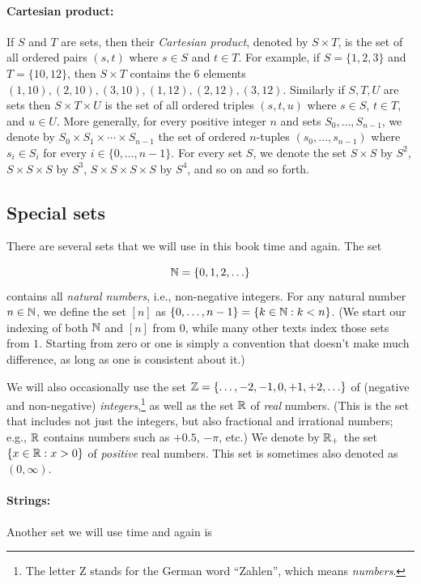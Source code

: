 \paragraph{Cartesian product:} If \(S\) and \(T\) are sets, then their
\emph{Cartesian product}, denoted by \(S \times T\), is the set of all
ordered pairs \((s,t)\) where \(s\in S\) and \(t\in T\). For example, if
\(S = \{1,2,3 \}\) and \(T = \{10,12 \}\), then \(S\times T\) contains
the \(6\) elements \((1,10),(2,10),(3,10),(1,12),(2,12),(3,12)\).
Similarly if \(S,T,U\) are sets then \(S\times T \times U\) is the set
of all ordered triples \((s,t,u)\) where \(s\in S\), \(t\in T\), and
\(u\in U\). More generally, for every positive integer \(n\) and sets
\(S_0,\ldots,S_{n-1}\), we denote by
\(S_0 \times S_1 \times \cdots \times S_{n-1}\) the set of ordered
\(n\)-tuples \((s_0,\ldots,s_{n-1})\) where \(s_i\in S_i\) for every
\(i \in \{0,\ldots, n-1\}\). For every set \(S\), we denote the set
\(S\times S\) by \(S^2\), \(S\times S\times S\) by \(S^3\),
\(S\times S\times S \times S\) by \(S^4\), and so on and so forth.

\subsection{Special sets}\label{specialsets}

There are several sets that we will use in this book time and again. The
set

\[
{\mathbb{N}} = \{ 0, 1,2, \ldots \}
\] contains all \emph{natural numbers}, i.e., non-negative integers. For
any natural number \(n\in{\mathbb{N}}\), we define the set \([n]\) as
\(\{0,\ldots, n-1\} = \{ k\in {\mathbb{N}} : k < n \}\). (We start our indexing of
both \({\mathbb{N}}\) and \([n]\) from \(0\), while many other texts index those
sets from \(1\). Starting from zero or one is simply a convention that
doesn't make much difference, as long as one is consistent about it.)

We will also occasionally use the set
\({\mathbb{Z}}=\{\ldots,-2,-1,0,+1,+2,\ldots \}\) of (negative and non-negative)
\emph{integers},\footnote{The letter Z stands for the German word
  ``Zahlen'', which means \emph{numbers}.} as well as the set \({\mathbb{R}}\) of
\emph{real} numbers. (This is the set that includes not just the
integers, but also fractional and irrational numbers; e.g., \({\mathbb{R}}\)
contains numbers such as \(+0.5\), \(-\pi\), etc.) We denote by \({\mathbb{R}}_+\)
the set \(\{ x\in {\mathbb{R}} : x > 0 \}\) of \emph{positive} real numbers. This
set is sometimes also denoted as \((0,\infty)\).

\paragraph{Strings:} Another set we will use time and again is

